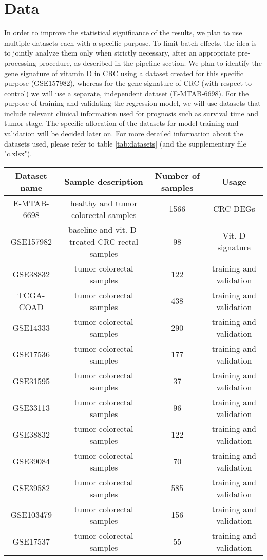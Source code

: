 \documentclass[fleqn,10pt]{SelfArx} %
\begin{document}
\section{Data}
In order to improve the statistical significance of the results, we plan to use multiple datasets each with a specific purpose. To limit batch effects, the idea is to jointly analyze them only when strictly necessary, after an appropriate pre-processing procedure, as described in the pipeline section. We plan to identify the gene signature of vitamin D in CRC using a dataset created for this specific purpose (GSE157982), whereas for the gene signature of CRC (with respect to control) we will use a separate, independent dataset (E-MTAB-6698).
For the purpose of training and validating the regression model, we will use datasets that include relevant clinical information used for prognosis such as survival time and tumor stage. The specific allocation of the datasets for model training and validation will be decided later on. For more detailed information about the datasets used, please refer to table \ref{tab:datasets} (and the supplementary file "c.xlsx").

\begin{table*}[ht]
	\centering
	\begin{tabular}{cccc}
		\hline
		Dataset name & Sample description & Number of samples & Usage \\
		\hline
		E-MTAB-6698	& healthy and tumor colorectal samples	&1566	&CRC DEGs\\
		GSE157982	&baseline and vit. D-treated CRC rectal samples	&98&	Vit. D signature\\
		GSE38832	&tumor colorectal samples	&122&	training and validation\\
		TCGA-COAD	&tumor colorectal samples	&438&	training and validation		\\
		GSE14333	&tumor colorectal samples	&290&	training and validation\\
		GSE17536	&tumor colorectal samples	&177&	training and validation	\\
		GSE31595	&tumor colorectal samples	&37	&training and validation	\\
		GSE33113	&tumor colorectal samples	&96	&training and validation	\\
		GSE38832	&tumor colorectal samples	&122&	training and validation	\\
		GSE39084	&tumor colorectal samples	&70	&training and validation	\\
		GSE39582	&tumor colorectal samples	&585&	training and validation	\\
		GSE103479	&tumor colorectal samples	&156&	training and validation	\\
		GSE17537	&tumor colorectal samples	&55	&training and validation	\\
		\hline
	\end{tabular}
	\caption{Datasets used}
	\label{tab:datasets}
\end{table*}
\end{document}
